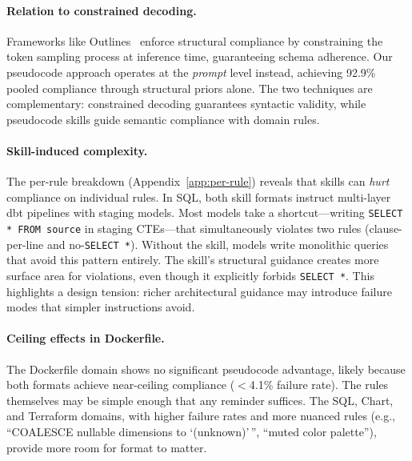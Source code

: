 \documentclass[sigconf,nonacm]{acmart}
\begin{document}
\paragraph{Relation to constrained decoding.}
Frameworks like Outlines~\cite{willard2023efficient} enforce structural
compliance by constraining the token sampling process at inference time,
guaranteeing schema adherence. Our pseudocode approach operates at the
\emph{prompt} level instead, achieving 92.9\% pooled compliance through
structural priors alone. The two techniques are complementary:
constrained decoding guarantees syntactic validity, while pseudocode
skills guide semantic compliance with domain rules.

\paragraph{Skill-induced complexity.}
The per-rule breakdown (Appendix~\ref{app:per-rule}) reveals that skills can
\emph{hurt} compliance on individual rules. In SQL, both skill formats
instruct multi-layer dbt pipelines with staging models. Most models take a
shortcut---writing \texttt{SELECT * FROM source} in staging CTEs---that
simultaneously violates two rules (clause-per-line and no-\texttt{SELECT~*}).
Without the skill, models write monolithic queries that avoid this pattern
entirely. The skill's structural guidance creates more surface area for
violations, even though it explicitly forbids \texttt{SELECT~*}. This
highlights a design tension: richer architectural guidance may introduce
failure modes that simpler instructions avoid.

\paragraph{Ceiling effects in Dockerfile.}
The Dockerfile domain shows no significant pseudocode advantage,
likely because both formats achieve near-ceiling compliance
($<$4.1\% failure rate).
The rules themselves may be simple enough that any reminder suffices. The SQL,
Chart, and Terraform domains, with higher failure rates and more nuanced rules
(e.g., ``COALESCE nullable dimensions to `(unknown)'\,'', ``muted color
palette''), provide more room for format to matter.
\end{document}
